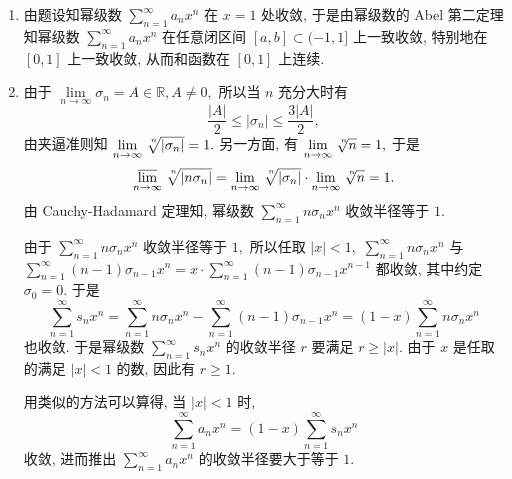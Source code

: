 \begin{solution}
  \begin{enumerate}
    \item 由题设知幂级数 $\sum\limits_{n=1}^{\infty} a_nx^n$ 在 $x = 1$ 处收敛, 于是由幂级数的 Abel 第二定理知幂级数 $\sum\limits_{n=1}^{\infty} a_nx^n$ 在任意闭区间 $[a, b] \subset (-1, 1]$ 上一致收敛, 特别地在 $[0, 1]$ 上一致收敛, 从而和函数在 $[0, 1]$ 上连续.
    \item 由于 $\lim\limits_{n\to\infty} \sigma_n = A \in \mathbb{R}, A \neq 0,$ 所以当 $n$ 充分大时有
    $$\dfrac{\lvert A \rvert}{2} \leqslant \lvert \sigma_n \rvert \leqslant \dfrac{3\lvert A \rvert}{2},$$
    由夹逼准则知 $\lim\limits_{n\to\infty} \nroot[n]{\lvert \sigma_n \rvert} = 1.$ 另一方面, 有 $\lim\limits_{n\to\infty} \nroot[n]{n} = 1,$ 于是
    $$\varlimsup_{n\to\infty} \nroot[n]{\lvert n\sigma_n \rvert} = \lim\limits_{n\to\infty} \nroot[n]{\lvert \sigma_n \rvert} \cdot \lim\limits_{n\to\infty} \nroot[n]{n} = 1.$$
    由 Cauchy-Hadamard 定理知, 幂级数 $\sum\limits_{n=1}^{\infty} n\sigma_n x^n$ 收敛半径等于 $1.$

    由于 $\sum\limits_{n=1}^{\infty} n\sigma_n x^n$ 收敛半径等于 $1,$ 所以任取 $\lvert x \rvert < 1,$ $\sum\limits_{n=1}^{\infty} n\sigma_n x^n$ 与 $\sum\limits_{n=1}^{\infty} (n-1) \sigma_{n-1} x^n = x \cdot \sum\limits_{n=1}^{\infty} (n-1) \sigma_{n-1} x^{n-1}$ 都收敛, 其中约定 $\sigma_0 = 0.$ 于是
    $$\sum\limits_{n=1}^{\infty} s_n x^n = \sum\limits_{n=1}^{\infty} n\sigma_n x^n - \sum\limits_{n=1}^{\infty} (n-1) \sigma_{n-1} x^n = (1-x) \sum\limits_{n=1}^{\infty} n\sigma_n x^n$$
    也收敛. 于是幂级数 $\sum\limits_{n=1}^{\infty} s_n x^n$ 的收敛半径 $r$ 要满足 $r \geqslant \lvert x \rvert.$ 由于 $x$ 是任取的满足 $\lvert x \rvert < 1$ 的数, 因此有 $r \geqslant 1.$

    用类似的方法可以算得, 当 $\lvert x \rvert < 1$ 时,
    $$\sum\limits_{n=1}^{\infty} a_n x^n = (1 - x) \sum\limits_{n=1}^{\infty} s_n x^n$$
    收敛, 进而推出 $\sum\limits_{n=1}^{\infty} a_n x^n$ 的收敛半径要大于等于 $1.$


\end{enumerate}
\end{solution}
